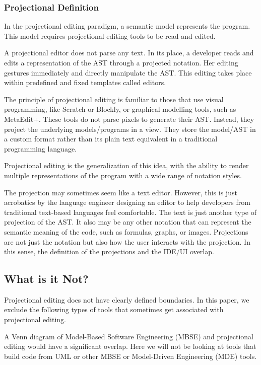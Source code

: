 \subsubsection{Projectional Definition}

In the projectional editing paradigm, a semantic model represents the program.
This model requires projectional editing tools to be read and edited.

A projectional editor does not parse any text.
In its place, a developer reads and edits a representation of the AST through a projected notation.
Her editing gestures immediately and directly manipulate the AST.
This editing takes place within predefined and fixed templates called editors.

The principle of projectional editing is familiar to those that use visual programming, like Scratch or Blockly, or graphical modelling tools, such as MetaEdit+.
These tools do not parse pixels to generate their AST.
Instead, they project the underlying models/programs in a view.
They store the model/AST in a custom format rather than its plain text equivalent in a traditional programming language.

Projectional editing is the generalization of this idea, with the ability to render multiple representations of the program with a wide range of notation styles.

The projection may sometimes seem like a text editor. 
However, this is just acrobatics by the language engineer designing an editor to help developers from traditional text-based languages feel comfortable.
The text is just another type of projection of the AST.
It also may be any other notation that can represent the semantic meaning of the code, such as formulas, graphs, or images.
Projections are not just the notation but also how the user interacts with the projection.
In this sense, the definition of the projections and the IDE/UI overlap.

\subsection{What is it Not?}

Projectional editing does not have clearly defined boundaries.
In this paper, we exclude the following types of tools that sometimes get associated with projectional editing.

A Venn diagram of Model-Based Software Engineering (MBSE) and projectional editing would have a significant overlap.
Here we will not be looking at tools that build code from UML or other MBSE or Model-Driven Engineering (MDE) tools.


